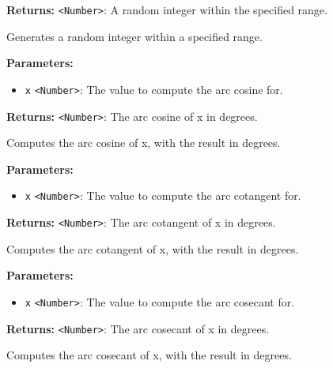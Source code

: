\documentclass[12pt,a4paper]{article}
\begin{document}
\noindent \textbf{Returns:} \texttt{<Number>}: A random integer within the specified range.

\noindent Generates a random integer within a specified range.

\vspace{5mm}
\noindent {}


\noindent \textbf{Parameters:}
\begin{itemize}
  \item \texttt{x} \texttt{<Number>}: The value to compute the arc cosine for.
\end{itemize}

\noindent \textbf{Returns:} \texttt{<Number>}: The arc cosine of x in degrees.

\noindent Computes the arc cosine of x, with the result in degrees.

\vspace{5mm}
\noindent {}


\noindent \textbf{Parameters:}
\begin{itemize}
  \item \texttt{x} \texttt{<Number>}: The value to compute the arc cotangent for.
\end{itemize}

\noindent \textbf{Returns:} \texttt{<Number>}: The arc cotangent of x in degrees.

\noindent Computes the arc cotangent of x, with the result in degrees.

\vspace{5mm}
\noindent {}


\noindent \textbf{Parameters:}
\begin{itemize}
  \item \texttt{x} \texttt{<Number>}: The value to compute the arc cosecant for.
\end{itemize}

\noindent \textbf{Returns:} \texttt{<Number>}: The arc cosecant of x in degrees.

\noindent Computes the arc cosecant of x, with the result in degrees.
\end{document}
